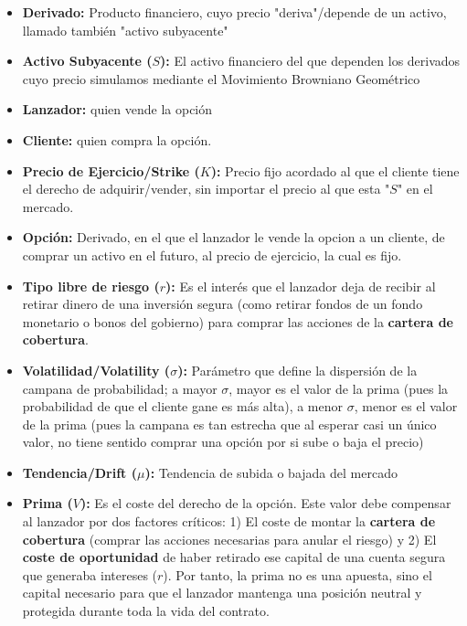 \documentclass[11pt]{article}
\newcommand{\comillas}[1]{"#1"} %
\begin{document}
	\begin{itemize}
		\item \textbf{Derivado:} Producto financiero, cuyo precio \comillas{deriva}/depende de un activo, llamado también \comillas{activo subyacente}
		
		\item \textbf{Activo Subyacente ($S$):} El activo financiero del que dependen los derivados cuyo precio simulamos mediante el Movimiento Browniano Geométrico
		
		\item \textbf{Lanzador:} quien vende la opción
		
		\item \textbf{Cliente:} quien compra la opción.
		
		\item \textbf{Precio de Ejercicio/Strike ($K$):} Precio fijo acordado al que el cliente tiene el derecho de adquirir/vender, sin importar el precio al que esta \comillas{$S$} en el mercado.
		
		\item \textbf{Opción:} Derivado, en el que el lanzador le vende la opcion a un cliente, de comprar un activo en el futuro, al precio de ejercicio, la cual es fijo.
		
		\item \textbf{Tipo libre de riesgo ($r$):} Es el interés que el lanzador deja de recibir al retirar dinero de una inversión segura (como retirar fondos de un fondo monetario o bonos del gobierno) para comprar las acciones de la \textbf{cartera de cobertura}.
		
		\item \textbf{Volatilidad/Volatility ($\sigma$):} Parámetro que define la dispersión de la campana de probabilidad; a mayor $\sigma$, mayor es el valor de la prima (pues la probabilidad de que el cliente gane es más alta), a menor $\sigma$, menor es el valor de la prima (pues la campana es tan estrecha que al esperar casi un único valor, no tiene sentido comprar una opción por si sube o baja el precio)
		
		\item \textbf{Tendencia/Drift ($\mu$):} Tendencia de subida o bajada del mercado
		
		\item \textbf{Prima ($V$):} Es el coste del derecho de la opción. Este valor debe compensar al lanzador por dos factores críticos: 1) El coste de montar la \textbf{cartera de cobertura} (comprar las acciones necesarias para anular el riesgo) y 2) El \textbf{coste de oportunidad} de haber retirado ese capital de una cuenta segura que generaba intereses ($r$). Por tanto, la prima no es una apuesta, sino el capital necesario para que el lanzador mantenga una posición neutral y protegida durante toda la vida del contrato.
		

\end{itemize}
\end{document}
